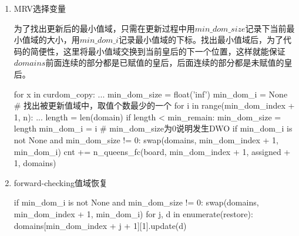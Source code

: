 \documentclass[10pt,letterpaper]{ctexart}
\begin{document}
\begin{enumerate}[itemindent=2em,label=\arabic*、]
\newpage
\item MRV选择变量
\par \qquad 为了找出更新后的最小值域，只需在更新过程中用$min\_dom\_size$记录下当前最小值域的大小，用$min\_dom\_i$记录最小值域的下标。找出最小值域后，为了代码的简便性，这里将最小值域交换到当前皇后的下一个位置，这样就能保证$domains$前面连续的部分都是已赋值的皇后，后面连续的部分都是未赋值的皇后。
\begin{python}
for x in curdom_copy:
    ...
    min_dom_size = float('inf')
    min_dom_i = None
    # 找出被更新值域中，取值个数最少的一个
    for i in range(min_dom_index + 1, n):
        ...
        length = len(domain)
        if length < min_remain:
            min_dom_size = length
            min_dom_i = i
    # min_dom_size为0说明发生DWO
    if min_dom_i is not None and min_dom_size != 0:
        swap(domains, min_dom_index + 1, min_dom_i)
        cnt += n_queens_fc(board, min_dom_index + 1, assigned + 1, domains)
\end{python}

\item forward-checking值域恢复
\begin{python}
if min_dom_i is not None and min_dom_size != 0:
    swap(domains, min_dom_index + 1, min_dom_i)
for j, d in enumerate(restore):
    domains[min_dom_index + j + 1][1].update(d)
\end{python}

\end{enumerate}
\end{document}
